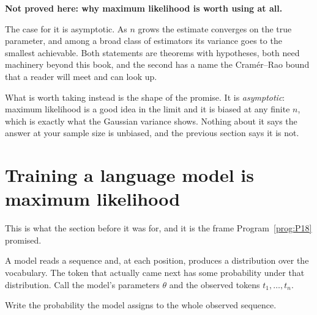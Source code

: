 \begin{fr}
\begin{rigourbox}
\textbf{Not proved here: why maximum likelihood is worth using at all.}

The case for it is asymptotic. As $n$ grows the estimate converges on the
true parameter, and among a broad class of estimators its variance goes to
the smallest achievable. Both statements are theorems with hypotheses, both
need machinery beyond this book, and the second has a name \dash{} the
Cramér--Rao bound \dash{} that a reader will meet and can look up.

What is worth taking instead is the shape of the promise. It is
\emph{asymptotic}: maximum likelihood is a good idea in the limit and it is
biased at any finite $n$, which is exactly what the Gaussian variance shows.
Nothing about it says the answer at your sample size is unbiased, and the
previous section says it is not.
\end{rigourbox}
\end{fr}

\section{Training a language model is maximum likelihood}
\label{sec:P26-training}

\begin{fr}
This is what the section before it was for, and it is the frame
Program~\ref{prog:P18} promised.

A model reads a sequence and, at each position, produces a distribution over
the vocabulary. The token that actually came next has some probability under
that distribution. Call the model's parameters $\theta$ and the observed
tokens $t_1, \dots, t_n$.

Write the probability the model assigns to the whole observed sequence.
\dotline
\nextframe
\end{fr}


